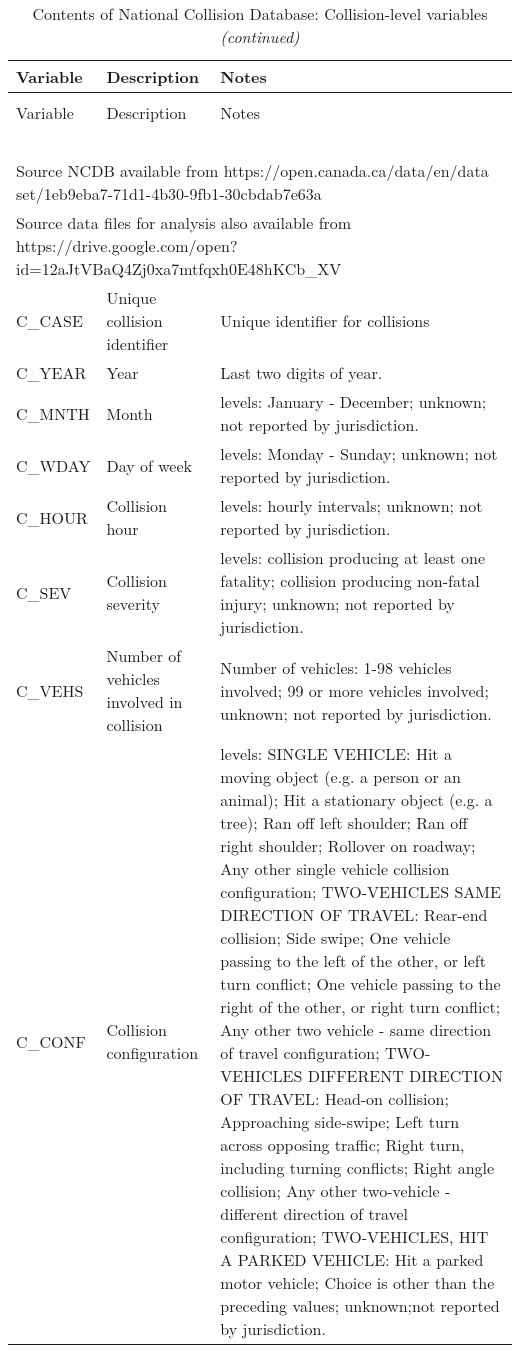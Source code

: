 \documentclass[]{elsarticle} %
\begin{document}
\begin{longtable}[t]{ll>{\raggedright\arraybackslash}p{32em}}
\caption{\label{tab:ncdb-descriptives-collision}\label{tab:ncdb-descriptives-collision}Contents of National Collision Database: Collision-level variables}\\
\toprule
Variable & Description & Notes\\
\midrule
\endfirsthead
\caption[]{\label{tab:ncdb-descriptives-collision}Contents of National Collision Database: Collision-level variables \textit{(continued)}}\\
\toprule
Variable & Description & Notes\\
\midrule
\endhead
\
\endfoot
\bottomrule
\multicolumn{3}{l}{\textit{Note: }}\\
\multicolumn{3}{l}{Source NCDB available from https://open.canada.ca/data/en/data set/1eb9eba7-71d1-4b30-9fb1-30cbdab7e63a}\\
\multicolumn{3}{l}{Source data files for analysis also available from https://drive.google.com/open?id=12aJtVBaQ4Zj0xa7mtfqxh0E48hKCb\_XV}\\
\endlastfoot
\rowcolor{gray!6}  C\_CASE & Unique collision identifier & Unique identifier for collisions\\
C\_YEAR & Year & Last two digits of year.\\
\rowcolor{gray!6}  C\_MNTH & Month & 14 levels: January - December; unknown; not reported by jurisdiction.\\
C\_WDAY & Day of week & 9 levels: Monday - Sunday; unknown; not reported by jurisdiction.\\
\rowcolor{gray!6}  C\_HOUR & Collision hour & 25 levels: hourly intervals; unknown; not reported by jurisdiction.\\
\addlinespace
C\_SEV & Collision severity & 4 levels: collision producing at least one fatality; collision producing non-fatal injury; unknown; not reported by jurisdiction.\\
\rowcolor{gray!6}  C\_VEHS & Number of vehicles involved in collision & Number of vehicles: 1-98 vehicles involved; 99 or more vehicles involved; unknown; not reported by jurisdiction.\\
C\_CONF & Collision configuration & 21 levels: SINGLE VEHICLE: Hit a moving object (e.g. a person or an animal); Hit a stationary object (e.g. a tree); Ran off left shoulder; Ran off right shoulder; Rollover on roadway; Any other single vehicle collision configuration; TWO-VEHICLES SAME DIRECTION OF TRAVEL: Rear-end collision; Side swipe; One vehicle passing to the left of the other, or left turn conflict; One vehicle passing to the right of the other, or right turn conflict; Any other two vehicle - same direction of travel configuration; TWO-VEHICLES DIFFERENT DIRECTION OF TRAVEL: Head-on collision; Approaching side-swipe; Left turn across opposing traffic; Right turn, including turning conflicts; Right angle collision; Any other two-vehicle - different direction of travel configuration; TWO-VEHICLES, HIT A PARKED VEHICLE: Hit a parked motor vehicle; Choice is other than the preceding values; unknown;not reported by jurisdiction.\\

\end{longtable}
\end{document}

